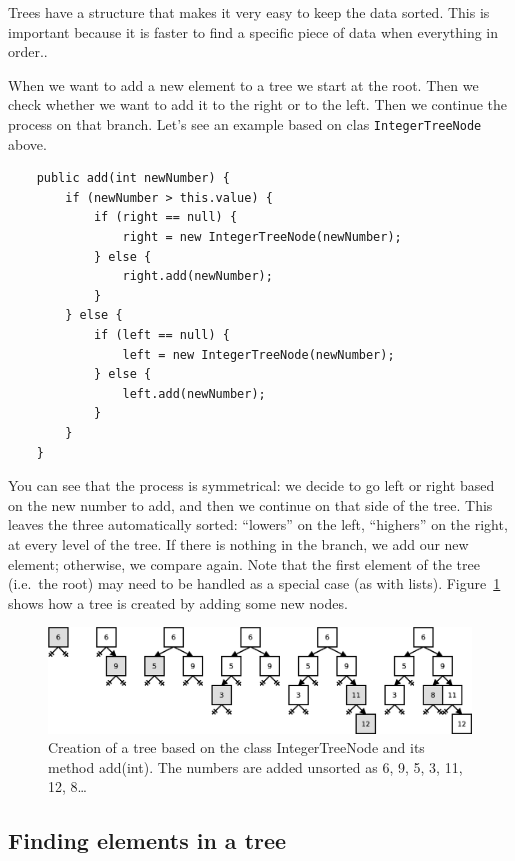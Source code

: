 Trees have a structure that makes it very easy to keep the data
sorted. This is important because it is faster to find a specific
piece of data when everything in order.. 

When we want to add a new element to a tree we start at the root. Then
we check whether we want to add it to the right or to the left. Then
we continue the process on that branch. Let's see an example based on 
clas \verb+IntegerTreeNode+ above.

\begin{verbatim}
    public add(int newNumber) {
        if (newNumber > this.value) {
            if (right == null) {
                right = new IntegerTreeNode(newNumber);
            } else {
                right.add(newNumber);
            }
        } else {
            if (left == null) {
                left = new IntegerTreeNode(newNumber);
            } else {
                left.add(newNumber);
            }
        }            
    }
\end{verbatim}

You can see that the process is symmetrical: we decide to go left or
right based on the new number to add, and then we continue on that
side of the tree. This leaves the three automatically sorted: ``lowers''
on the left, ``highers'' on the right, at every level of the tree. If
there is nothing in the branch, we add our new element; otherwise, we
compare again. 
Note that the first element of the tree (i.e.~the
root) may need to be handled as a special case (as with
lists). Figure~\ref{fig:treecr} shows how a tree is created by adding
some new nodes. 

\begin{figure}[hbtp]
  \centering
  \includegraphics[width=\textwidth]{gfx/tree-creation}
  \caption{Creation of a tree based on the class IntegerTreeNode and
    its method add(int). The numbers are added unsorted as 6, 9, 5, 3,
    11, 12, 8\ldots} 
  \label{fig:treecr}
\end{figure}

\subsection{Finding elements in a tree}
\label{sec:find-elem-tree}

